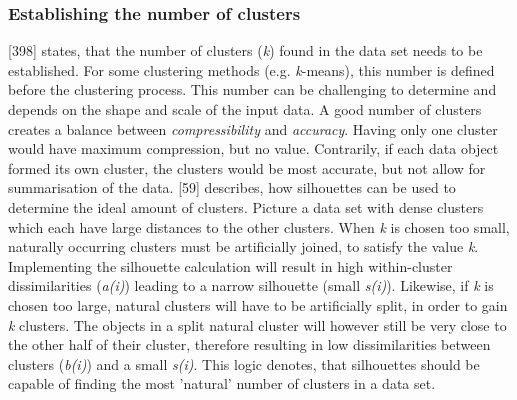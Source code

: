\subsubsection{Establishing the number of clusters}
 \textcite{han2011data}[398] states, that the number of clusters (\textit{k}) found in the data set needs to be established. For some clustering methods (e.g. \textit{k}-means), this number is defined before the clustering process. This number can be challenging to determine and depends on the shape and scale of the input data. A good number of clusters creates a balance between \textit{compressibility} and \textit{accuracy}. Having only one cluster would have maximum compression, but no value. Contrarily, if each data object formed its own cluster, the clusters would be most accurate, but not allow for summarisation of the data. 
\textcite{rousseeuw1987silhouettes}[59] describes, how silhouettes can be used to determine the ideal amount of clusters. Picture a data set with dense clusters which each have large distances to the other clusters. When \textit{k} is chosen too small, naturally occurring clusters must be artificially joined, to satisfy the value \textit{k}. Implementing the silhouette calculation will result in high within-cluster dissimilarities (\textit{a(i)}) leading to a narrow silhouette (small \textit{s(i)}). Likewise, if \textit{k} is chosen too large, natural clusters will have to be artificially split, in order to gain \textit{k} clusters. The objects in a split natural cluster will however still be very close to the other half of their cluster, therefore resulting in low dissimilarities between clusters (\textit{b(i)}) and a small \textit{s(i)}.
This logic denotes, that silhouettes should be capable of finding the most 'natural' number of clusters in a data set.


  